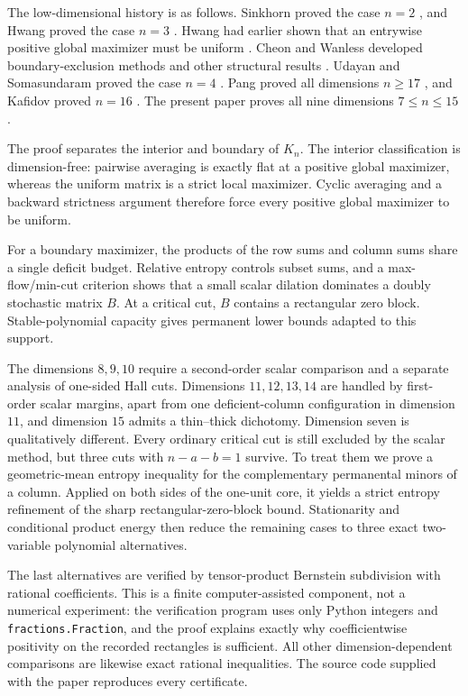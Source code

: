 \documentclass[11pt]{article}
\theoremstyle{definition}
\newcommand{\1}{\mathbf{1}}
\begin{document}
The low-dimensional history is as follows.  Sinkhorn proved the case $n=2$
\cite{Sinkhorn1984}, and Hwang proved the case $n=3$ \cite{Hwang1987}.
Hwang had earlier shown that an entrywise positive global maximizer must be
uniform \cite{Hwang1986}.  Cheon and Wanless developed boundary-exclusion
methods and other structural results \cite{CheonWanless2012}.  Udayan and
Somasundaram proved the case $n=4$ \cite{UdayanSomasundaram2024}.  Pang proved
all dimensions $n\ge17$ \cite{Pang2026}, and Kafidov proved $n=16$
\cite{Kafidov2026}.  The present paper proves all nine dimensions
$7\le n\le15$.

The proof separates the interior and boundary of $K_n$.  The interior
classification is dimension-free: pairwise averaging is exactly flat at a
positive global maximizer, whereas the uniform matrix is a strict local
maximizer.  Cyclic averaging and a backward strictness argument therefore
force every positive global maximizer to be uniform.

For a boundary maximizer, the products of the row sums and column sums share
a single deficit budget.  Relative entropy controls subset sums, and a
max-flow/min-cut criterion shows that a small scalar dilation dominates a
doubly stochastic matrix $B$.  At a critical cut, $B$ contains a rectangular
zero block.  Stable-polynomial capacity gives permanent lower bounds adapted
to this support.

The dimensions $8,9,10$ require a second-order scalar comparison and a
separate analysis of one-sided Hall cuts.  Dimensions $11,12,13,14$ are
handled by first-order scalar margins, apart from one deficient-column
configuration in dimension $11$, and dimension $15$ admits a thin--thick
dichotomy.  Dimension seven is qualitatively different.  Every ordinary
critical cut is still excluded by the scalar method, but three cuts with
$n-a-b=1$ survive.  To treat them we prove a geometric-mean entropy inequality
for the complementary permanental minors of a column.  Applied on both sides
of the one-unit core, it yields a strict entropy refinement of the sharp
rectangular-zero-block bound.  Stationarity and conditional product energy
then reduce the remaining cases to three exact two-variable polynomial
alternatives.

The last alternatives are verified by tensor-product Bernstein subdivision
with rational coefficients.  This is a finite computer-assisted component,
not a numerical experiment: the verification program uses only Python
integers and \texttt{fractions.Fraction}, and the proof explains exactly why
coefficientwise positivity on the recorded rectangles is sufficient.  All
other dimension-dependent comparisons are likewise exact rational
inequalities.  The source code supplied with the paper reproduces every
certificate.
\end{document}
